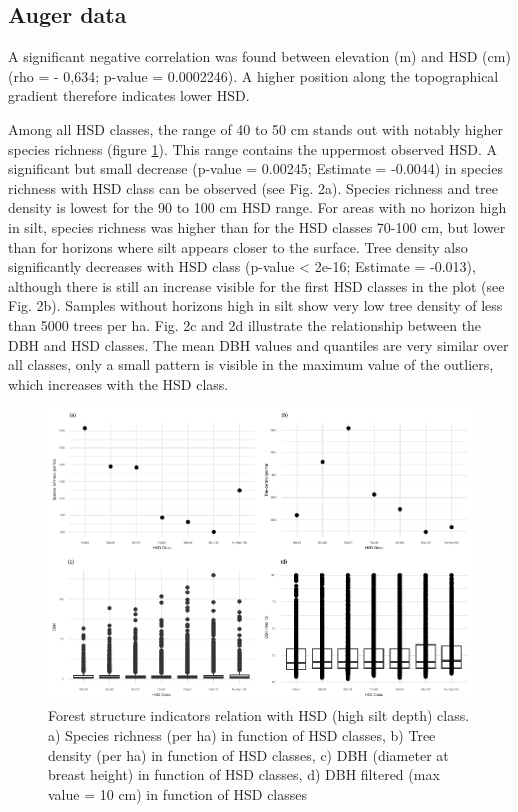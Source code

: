 \documentclass[fleqn,10pt]{latex/stylish_article} %
\begin{document}
\hypertarget{auger-data}{%
\subsection{Auger data}\label{auger-data}}

A significant negative correlation was found between elevation (m) and HSD (cm) (rho = - 0,634; p-value = 0.0002246). A higher position along the topographical gradient therefore indicates lower HSD.

Among all HSD classes, the range of 40 to 50 cm stands out with notably higher species richness (figure \ref{fig:auger}). This range contains the uppermost observed HSD. A significant but small decrease (p-value = 0.00245; Estimate = -0.0044) in species richness with HSD class can be observed (see Fig. 2a). Species richness and tree density is lowest for the 90 to 100 cm HSD range. For areas with no horizon high in silt, species richness was higher than for the HSD classes 70-100 cm, but lower than for horizons where silt appears closer to the surface. Tree density also significantly decreases with HSD class (p-value \textless{} 2e-16; Estimate = -0.013), although there is still an increase visible for the first HSD classes in the plot (see Fig. 2b). Samples without horizons high in silt show very low tree density of less than 5000 trees per ha.
Fig. 2c and 2d illustrate the relationship between the DBH and HSD classes. The mean DBH values and quantiles are very similar over all classes, only a small pattern is visible in the maximum value of the outliers, which increases with the HSD class.



\scriptsize

\begin{figure}

{\centering \includegraphics[width=0.8\linewidth,]{pedoP16-report_files/figure-latex/auger-1} 

}

\caption{Forest structure indicators relation with HSD (high silt depth) class. a) Species richness (per ha) in function of HSD classes, b) Tree density (per ha) in function of HSD classes, c) DBH (diameter at breast height) in function of HSD classes, d) DBH filtered (max value = 10 cm) in function of HSD classes}\label{fig:auger}
\end{figure}
\end{document}
